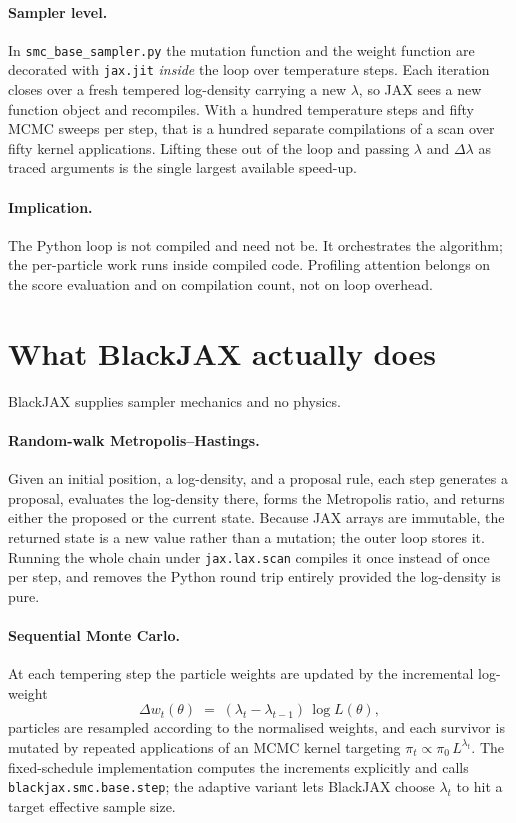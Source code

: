 \documentclass[11pt]{article}
\newcommand{\code}[1]{\texttt{#1}}
\begin{document}
\paragraph{Sampler level.}
In \code{smc\_base\_sampler.py} the mutation function and the weight function
are decorated with \code{jax.jit} \emph{inside} the loop over temperature steps.
Each iteration closes over a fresh tempered log-density carrying a new
$\lambda$, so JAX sees a new function object and recompiles. With a hundred
temperature steps and fifty MCMC sweeps per step, that is a hundred separate
compilations of a scan over fifty kernel applications. Lifting these out of the
loop and passing $\lambda$ and $\Delta\lambda$ as traced arguments is the single
largest available speed-up.

\paragraph{Implication.}
The Python loop is not compiled and need not be. It orchestrates the algorithm;
the per-particle work runs inside compiled code. Profiling attention belongs on
the score evaluation and on compilation count, not on loop overhead.

\section{What BlackJAX actually does}

BlackJAX supplies sampler mechanics and no physics.

\paragraph{Random-walk Metropolis--Hastings.}
Given an initial position, a log-density, and a proposal rule, each step
generates a proposal, evaluates the log-density there, forms the Metropolis
ratio, and returns either the proposed or the current state. Because JAX arrays
are immutable, the returned state is a new value rather than a mutation; the
outer loop stores it. Running the whole chain under \code{jax.lax.scan} compiles
it once instead of once per step, and removes the Python round trip entirely
provided the log-density is pure.

\paragraph{Sequential Monte Carlo.}
At each tempering step the particle weights are updated by the incremental
log-weight
\begin{equation}
  \Delta w_t(\theta) \;=\; (\lambda_t - \lambda_{t-1})\,\log L(\theta),
\end{equation}
particles are resampled according to the normalised weights, and each survivor
is mutated by repeated applications of an MCMC kernel targeting
$\pi_t \propto \pi_0 \, L^{\lambda_t}$. The fixed-schedule implementation
computes the increments explicitly and calls \code{blackjax.smc.base.step};
the adaptive variant lets BlackJAX choose $\lambda_t$ to hit a target effective
sample size.
\end{document}
